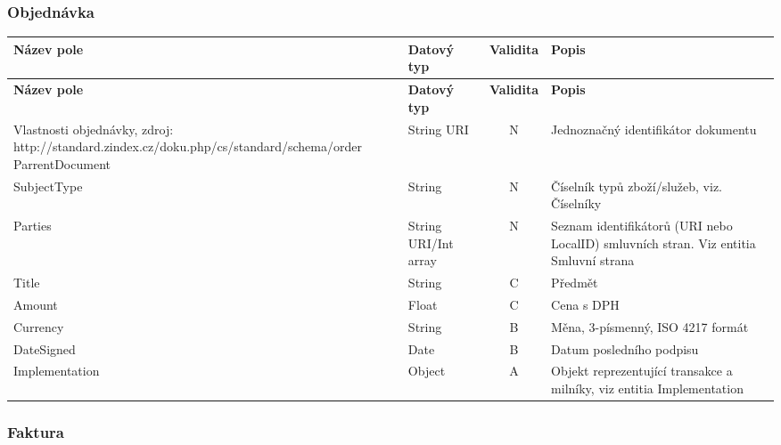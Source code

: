 \subsubsection*{Objednávka}

\begin{center}
\begin{longtable}{lp{20mm}cp{65mm}}
\label{grid_mlmmh} \\
\multicolumn{1}{l}{\textbf{Název pole}} & 
\multicolumn{1}{l}{\textbf{Datový typ}} & 
\multicolumn{1}{l}{\textbf{Validita}} & 
\multicolumn{1}{l}{\textbf{Popis}} \\ \hline 
\endfirsthead
\multicolumn{1}{l}{\textbf{Název pole}} & 
\multicolumn{1}{l}{\textbf{Datový typ}} & 
\multicolumn{1}{l}{\textbf{Validita}} & 
\multicolumn{1}{l}{\textbf{Popis}} \\ \hline 
\hline
\endhead
\endfoot
\caption{Vlastnosti objednávky, zdroj:\\http://standard.zindex.cz/doku.php/cs/standard/schema/order}
\endlastfoot
ParrentDocument & String URI & N & Jednoznačný identifikátor dokumentu \\
SubjectType & String & N & Číselník typů zboží/služeb, viz. Číselníky \\
Parties & String URI/Int array & N & Seznam identifikátorů (URI nebo LocalID) smluvních stran. Viz entitia Smluvní strana \\
\rowcolor{validateC}Title & String & C & Předmět \\
\rowcolor{validateC}Amount & Float & C & Cena s DPH \\
\rowcolor{validateB}Currency & String & B & Měna, 3-písmenný, ISO 4217 formát \\
\rowcolor{validateB}DateSigned & Date & B & Datum posledního podpisu \\
\rowcolor{validateA}Implementation & Object & A & Objekt reprezentující transakce a milníky, viz entitia Implementation \\
\end{longtable}
\end{center}

\subsubsection*{Faktura}

